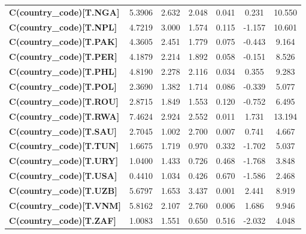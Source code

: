 \begin{center}
\begin{tabular}{lcccccc}
\textbf{C(country\_code)[T.NGA]} &       5.3906  &        2.632     &     2.048  &         0.041        &        0.231    &       10.550     \\
\textbf{C(country\_code)[T.NPL]} &       4.7219  &        3.000     &     1.574  &         0.115        &       -1.157    &       10.601     \\
\textbf{C(country\_code)[T.PAK]} &       4.3605  &        2.451     &     1.779  &         0.075        &       -0.443    &        9.164     \\
\textbf{C(country\_code)[T.PER]} &       4.1879  &        2.214     &     1.892  &         0.058        &       -0.151    &        8.526     \\
\textbf{C(country\_code)[T.PHL]} &       4.8190  &        2.278     &     2.116  &         0.034        &        0.355    &        9.283     \\
\textbf{C(country\_code)[T.POL]} &       2.3690  &        1.382     &     1.714  &         0.086        &       -0.339    &        5.077     \\
\textbf{C(country\_code)[T.ROU]} &       2.8715  &        1.849     &     1.553  &         0.120        &       -0.752    &        6.495     \\
\textbf{C(country\_code)[T.RWA]} &       7.4624  &        2.924     &     2.552  &         0.011        &        1.731    &       13.194     \\
\textbf{C(country\_code)[T.SAU]} &       2.7045  &        1.002     &     2.700  &         0.007        &        0.741    &        4.667     \\
\textbf{C(country\_code)[T.TUN]} &       1.6675  &        1.719     &     0.970  &         0.332        &       -1.702    &        5.037     \\
\textbf{C(country\_code)[T.URY]} &       1.0400  &        1.433     &     0.726  &         0.468        &       -1.768    &        3.848     \\
\textbf{C(country\_code)[T.USA]} &       0.4410  &        1.034     &     0.426  &         0.670        &       -1.586    &        2.468     \\
\textbf{C(country\_code)[T.UZB]} &       5.6797  &        1.653     &     3.437  &         0.001        &        2.441    &        8.919     \\
\textbf{C(country\_code)[T.VNM]} &       5.8162  &        2.107     &     2.760  &         0.006        &        1.686    &        9.946     \\
\textbf{C(country\_code)[T.ZAF]} &       1.0083  &        1.551     &     0.650  &         0.516        &       -2.032    &        4.048     \\

\end{tabular}
\end{center}
